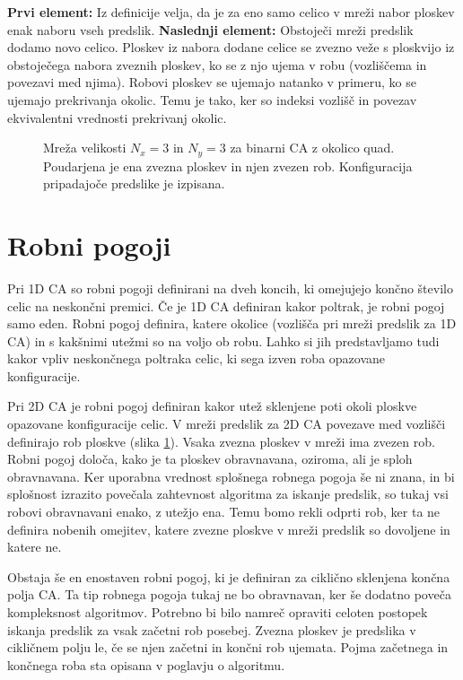 \documentclass[12pt,a4paper,openany,twoside]{book}
\begin{document}
\textbf{Prvi element:}
Iz definicije velja, da je za eno samo celico v mreži nabor ploskev enak naboru vseh predslik.
\textbf{Naslednji element:}
Obstoječi mreži predslik dodamo novo celico.
Ploskev iz nabora dodane celice se zvezno veže s ploskvijo
iz obstoječega nabora zveznih ploskev,
ko se z njo ujema v robu (vozliščema in povezavi med njima).
Robovi ploskev se ujemajo natanko v primeru, ko se ujemajo prekrivanja okolic.
Temu je tako, ker so indeksi vozlišč in povezav ekvivalentni vrednosti prekrivanj okolic.

\begin{figure}[htb]
\centerline{}
\caption[Mreža polja celic.]{Mreža velikosti \(N_x=3\) in \(N_y=3\) za binarni CA z okolico quad.
Poudarjena je ena zvezna ploskev in njen zvezen rob. Konfiguracija pripadajoče predslike je izpisana.}
\label{network_array}
\end{figure}

\section{Robni pogoji} 

Pri 1D CA so robni pogoji definirani na dveh koncih,
ki omejujejo končno število celic na neskončni premici.
Če je 1D CA definiran kakor poltrak, je robni pogoj samo eden.
Robni pogoj definira, katere okolice (vozlišča pri mreži predslik za 1D CA)
in s kakšnimi utežmi so na voljo ob robu.
Lahko si jih predstavljamo tudi kakor vpliv neskončnega poltraka celic,
ki sega izven roba opazovane konfiguracije.

Pri 2D CA je robni pogoj definiran kakor utež sklenjene poti okoli ploskve opazovane konfiguracije celic.
V mreži predslik za 2D CA povezave med vozlišči definirajo rob ploskve (slika \ref{network_array}).
Vsaka zvezna ploskev v mreži ima zvezen rob. Robni pogoj določa, kako je ta ploskev obravnavana,
oziroma, ali je sploh obravnavana.
Ker uporabna vrednost splošnega robnega pogoja še ni znana,
in bi splošnost izrazito povečala zahtevnost algoritma za iskanje predslik,
so tukaj vsi robovi obravnavani enako, z utežjo ena. Temu bomo rekli odprti rob,
ker ta ne definira nobenih omejitev, katere zvezne ploskve v mreži predslik
so dovoljene in katere ne.

Obstaja še en enostaven robni pogoj, ki je definiran za ciklično sklenjena končna polja CA.
Ta tip robnega pogoja tukaj ne bo obravnavan, ker še dodatno poveča kompleksnost algoritmov.
Potrebno bi bilo namreč opraviti celoten postopek iskanja predslik za vsak začetni rob posebej.
Zvezna ploskev je predslika v cikličnem polju le, če se njen začetni in končni rob ujemata.
Pojma začetnega in končnega roba sta opisana v poglavju o algoritmu.
\end{document}
